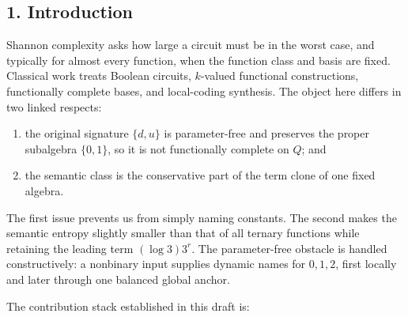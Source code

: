 \documentclass[
  11pt,
]{article}
\providecommand{\tightlist}{%
  \setlength{\itemsep}{0pt}\setlength{\parskip}{0pt}}
\theoremstyle{definition}
\theoremstyle{remark}
\begin{document}
\hypertarget{introduction}{%
\subsection{1. Introduction}\label{introduction}}

Shannon complexity asks how large a circuit must be in the worst case,
and typically for almost every function, when the function class and
basis are fixed. Classical work treats Boolean circuits, \(k\)-valued
functional constructions, functionally complete bases, and local-coding
synthesis. The object here differs in two linked respects:

\begin{enumerate}
\def\labelenumi{\arabic{enumi}.}
\tightlist
\item
  the original signature \(\{d,u\}\) is parameter-free and preserves the
  proper subalgebra \(\{0,1\}\), so it is not functionally complete on
  \(Q\); and
\item
  the semantic class is the conservative part of the term clone of one
  fixed algebra.
\end{enumerate}

The first issue prevents us from simply naming constants. The second
makes the semantic entropy slightly smaller than that of all ternary
functions while retaining the leading term \((\log 3)3^r\). The
parameter-free obstacle is handled constructively: a nonbinary input
supplies dynamic names for \(0,1,2\), first locally and later through
one balanced global anchor.

The contribution stack established in this draft is:
\end{document}
